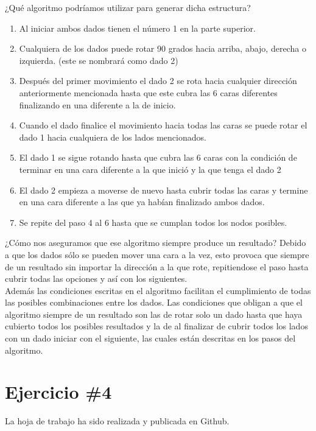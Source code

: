 \documentclass{article}
\begin{document}
¿Qué algoritmo podríamos utilizar para generar dicha estructura?
\begin{enumerate}
\item{Al iniciar ambos dados tienen el número 1 en la parte superior.}
\item{Cualquiera de los dados puede rotar 90 grados hacia arriba, abajo, derecha o izquierda. (este se nombrará como dado 2)}
\item{ Después del primer movimiento el dado 2 se rota hacia cualquier dirección anteriormente mencionada hasta que este cubra las 6 caras diferentes finalizando en una diferente a la de inicio.}
\item{Cuando el dado finalice el movimiento hacia todas las caras se puede rotar el dado 1 hacia cualquiera de los lados mencionados.}
\item{El dado 1 se sigue rotando hasta que cubra las 6 caras con la condición de terminar en una cara diferente a la que inició y la que tenga el dado 2}
\item{El dado 2 empieza a moverse de nuevo hasta cubrir todas las caras y termine en una cara diferente a las que ya habían finalizado ambos dados.}
\item{Se repite del paso 4 al 6 hasta que se cumplan todos los nodos posibles.}
\end{enumerate}
¿Cómo nos aseguramos que ese algoritmo siempre produce un resultado?
Debido a que los dados sólo se pueden mover  una cara a la vez, esto provoca que siempre de un resultado sin importar la dirección a la que rote, repitiendose el paso hasta cubrir todas las opciones y así con los siguientes.\\
Además las condiciones escritas en el algoritmo facilitan el cumplimiento de todas las posibles combinaciones entre los dados.
Las condiciones que obligan a que el algoritmo siempre de un resultado son las de rotar solo un dado hasta que haya cubierto todos los posibles resultados y la de al finalizar de cubrir todos los lados con un dado iniciar con el siguiente, las cuales están descritas en los pasos del algoritmo.

\section*{Ejercicio \#4}
La hoja de trabajo ha sido realizada y publicada en Github.
\end{document}
